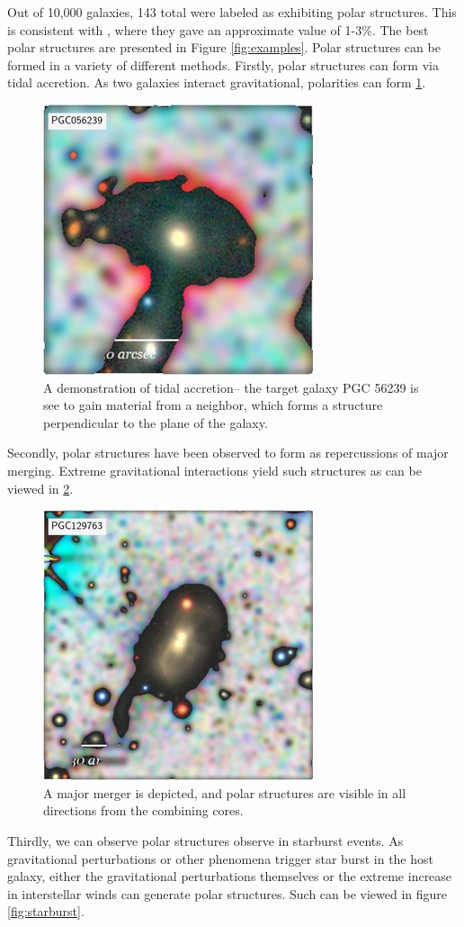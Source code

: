 \documentclass[letter]{aa}
\begin{document}
Out of 10,000 galaxies, 143 total were labeled as exhibiting polar structures. This is consistent with \citet{2024AstL...}, where they gave an approximate value of 1-3\%. The best polar structures are presented in Figure \ref{fig:examples}. Polar structures can be formed in a variety of different methods. 
Firstly, polar structures can form via tidal accretion. As two galaxies interact gravitational, polarities can form \ref{fig:tidalacc}.
\begin{figure}
\centering
    \includegraphics[scale = 0.7]{Images/PGC056239.jpg}
    \caption{A demonstration of tidal accretion-- the target galaxy PGC 56239 is see to gain material from a neighbor, which forms a structure perpendicular to the plane of the galaxy. }
    \label{fig:tidalacc}
\end{figure}
Secondly, polar structures have been observed to form as repercussions of major merging. Extreme gravitational interactions yield such structures as can be viewed in \ref{fig:major}.
\begin{figure}
    \centering
    \includegraphics[scale = 0.7]{Images/PGC129763.jpg}
    \caption{A major merger is depicted, and polar structures are visible in all directions from the combining cores.}
    \label{fig:major}
\end{figure}
Thirdly, we can observe polar structures observe in starburst events. As gravitational perturbations or other phenomena trigger star burst in the host galaxy, either the gravitational perturbations themselves or the extreme increase in interstellar winds can generate polar structures. Such can be viewed in figure \ref{fig:starburst}.
\end{document}
